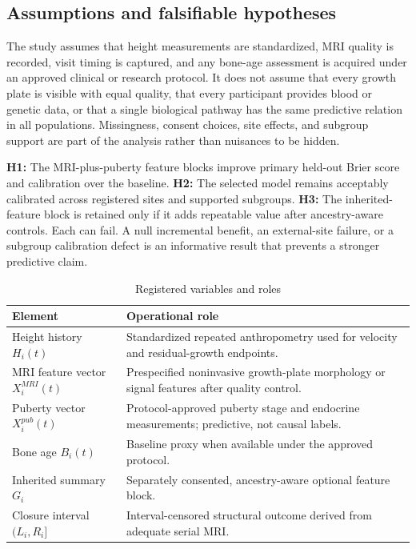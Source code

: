 \documentclass[conference]{IEEEtran}
\begin{document}
\subsection{Assumptions and falsifiable hypotheses}

The study assumes that height measurements are standardized, MRI quality is recorded, visit timing is captured, and any bone-age assessment is acquired under an approved clinical or research protocol. It does not assume that every growth plate is visible with equal quality, that every participant provides blood or genetic data, or that a single biological pathway has the same predictive relation in all populations. Missingness, consent choices, site effects, and subgroup support are part of the analysis rather than nuisances to be hidden.

\textbf{H1:} The MRI-plus-puberty feature blocks improve primary held-out Brier score and calibration over the baseline. \textbf{H2:} The selected model remains acceptably calibrated across registered sites and supported subgroups. \textbf{H3:} The inherited-feature block is retained only if it adds repeatable value after ancestry-aware controls. Each can fail. A null incremental benefit, an external-site failure, or a subgroup calibration defect is an informative result that prevents a stronger predictive claim.

\begin{table}[t]
\caption{Registered variables and roles}
\label{tab:variables}
\centering
\footnotesize
\begin{tabular}{p{}p{}}
\toprule
Element & Operational role \\
\midrule
Height history $H_i(t)$ & Standardized repeated anthropometry used for velocity and residual-growth endpoints. \\
MRI feature vector $X_i^{MRI}(t)$ & Prespecified noninvasive growth-plate morphology or signal features after quality control. \\
Puberty vector $X_i^{pub}(t)$ & Protocol-approved puberty stage and endocrine measurements; predictive, not causal labels. \\
Bone age $B_i(t)$ & Baseline proxy when available under the approved protocol. \\
Inherited summary $G_i$ & Separately consented, ancestry-aware optional feature block. \\
Closure interval $(L_i,R_i]$ & Interval-censored structural outcome derived from adequate serial MRI. \\
\bottomrule
\end{tabular}
\end{table}
\end{document}
